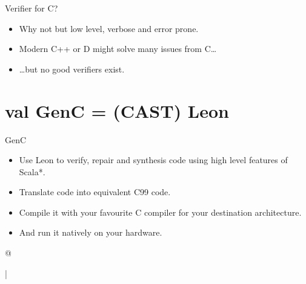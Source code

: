 \documentclass[10pt, compress, xcolor={usenames,dvipsnames}]{beamer}
\newcommand{\SmallArrow}{\ding{228}}
\newcommand{\Triangle}{$\triangleright$\xspace}
\renewcommand{\emph}[1]{\alert{#1}}
\newcommand{\light}{\color{TealBlue}}
\begin{document}
\begin{frame}[fragile]{Verifier for C?}

  \begin{itemize}[label=\SmallArrow]
    \item Why not but low level, verbose and error prone.
    \item Modern C++ or D might solve many issues from C\ldots
    \item \ldots but no good verifiers exist.
  \end{itemize}

\end{frame}


\section{val GenC = (CAST) Leon}

\begin{frame}[fragile]{GenC}

  \begin{itemize}[label=\Triangle]
    \item Use Leon to {\light verify, repair and synthesis} code using high level
      features of Scala*. \pause
    \item Translate code into \emph{equivalent} C99 code. \pause
    \item Compile it with your favourite C compiler for your destination
      architecture. \pause
    \item And run it {\light natively} on your hardware.
  \end{itemize}

\end{frame}


\lstMakeShortInline[%
  style=scala-color,%
  flexiblecolumns=false,%
  mathescape=false,%
  basicstyle=\color{blue!30!darkgray}\tt]@

\lstMakeShortInline[%
  language=C,%
  flexiblecolumns=false,%
  mathescape=false,%
  basicstyle=\color{blue!30!darkgray}\tt]|
\end{document}
